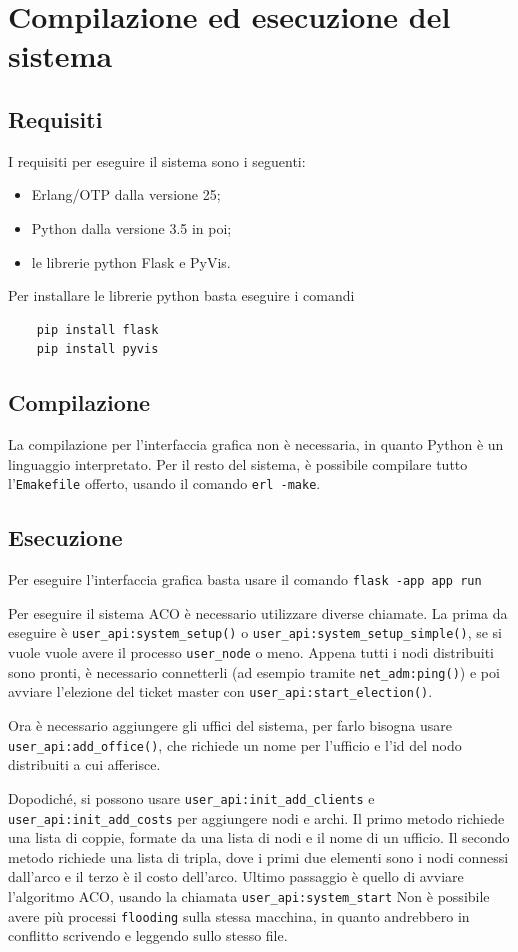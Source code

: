 \chapter{Compilazione ed esecuzione del sistema}
\section{Requisiti}
I requisiti per eseguire il sistema sono i seguenti:
\begin{itemize}
    \item Erlang/OTP dalla versione 25;
    \item Python dalla versione 3.5 in poi;
    \item le librerie python Flask e PyVis.
\end{itemize}
Per installare le librerie python basta eseguire i comandi
\begin{verbatim}
    pip install flask
    pip install pyvis
\end{verbatim}

\section{Compilazione}
La compilazione per l'interfaccia grafica non è necessaria, in quanto Python è un linguaggio interpretato.
Per il resto del sistema, è possibile compilare tutto l'\texttt{Emakefile} offerto, usando il comando \texttt{erl -make}.

\section{Esecuzione}
Per eseguire l'interfaccia grafica basta usare il comando \texttt{flask -app app run}

Per eseguire il sistema ACO è necessario utilizzare diverse chiamate.
La prima da eseguire è \texttt{user\_api:system\_setup()} o \texttt{user\_api:system\_setup\_simple()}, se si vuole vuole avere
il processo \texttt{user\_node} o meno. 
Appena tutti i nodi distribuiti sono pronti, è necessario connetterli (ad esempio tramite \texttt{net\_adm:ping()}) e poi avviare
l'elezione del ticket master con \texttt{user\_api:start\_election()}.

Ora è necessario aggiungere gli uffici del sistema, per farlo bisogna usare \texttt{user\_api:add\_office()}, che richiede un 
nome per l'ufficio e l'id del nodo distribuiti a cui afferisce.

Dopodiché, si possono usare \texttt{user\_api:init\_add\_clients} e \texttt{user\_api:init\_add\_costs} per aggiungere nodi e archi.
Il primo metodo richiede una lista di coppie, formate da una lista di nodi e il nome di un ufficio. Il secondo metodo richiede una lista 
di tripla, dove i primi due elementi sono i nodi connessi dall'arco e il terzo è il costo dell'arco.
Ultimo passaggio è quello di avviare l'algoritmo ACO, usando la chiamata \texttt{user\_api:system\_start}
Non è possibile avere più processi \texttt{flooding} sulla stessa macchina, in quanto andrebbero in conflitto scrivendo e leggendo
sullo stesso file.

